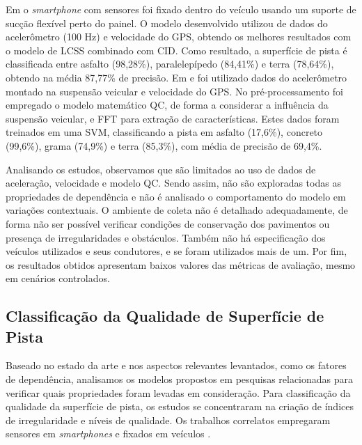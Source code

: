 Em \cite{Souza2018} o \textit{smartphone} com sensores foi fixado dentro do veículo usando um suporte de sucção flexível perto do painel. O modelo desenvolvido utilizou de dados do acelerômetro (100 Hz) e velocidade do GPS, obtendo os melhores resultados com o modelo de LCSS combinado com CID. Como resultado, a superfície de pista é classificada entre asfalto (98,28\%), paralelepípedo (84,41\%) e terra (78,64\%), obtendo na média 87,77\% de precisão. Em  \cite{Wang2018_1} e \cite{Wang2017} foi utilizado dados do acelerômetro montado na suspensão veicular e velocidade do GPS. No pré-processamento foi empregado o modelo matemático QC, de forma a considerar a influência da suspensão veicular, e FFT para extração de características. Estes dados foram treinados em uma SVM, classificando a pista em asfalto (17,6\%), concreto (99,6\%), grama (74,9\%) e terra (85,3\%), com média de precisão de 69,4\%. 

Analisando os estudos, observamos que são limitados ao uso de dados de aceleração, velocidade e modelo QC. Sendo assim, não são exploradas todas as propriedades de dependência e não é analisado o comportamento do modelo em variações contextuais. O ambiente de coleta não é detalhado adequadamente, de forma não ser possível verificar condições de conservação dos pavimentos ou presença de irregularidades e obstáculos. Também não há especificação dos veículos utilizados e seus condutores, e se foram utilizados mais de um. Por fim, os resultados obtidos apresentam baixos valores das métricas de avaliação, mesmo em cenários controlados.

\subsection{Classificação da Qualidade de Superfície de Pista}

Baseado no estado da arte e nos aspectos relevantes levantados, como os fatores de dependência, analisamos os modelos propostos em pesquisas relacionadas para verificar quais propriedades foram levadas em consideração. Para classificação da qualidade da superfície de pista, os estudos se concentraram na criação de índices de irregularidade e níveis de qualidade. Os trabalhos correlatos empregaram sensores em \textit{smartphones} \cite{Douangphachanh2014_1,Lima2016,Brunauer2016,Zhao2016,Allouch2017,Souza2018_1,Li2018,Nunes2019,Tiwari2020,Badurowicz2020,AbdelRaheem2020} e fixados em veículos \cite{Chen2013, Chen2016,Pitonak2016,Prapulla2017,Pont2017,Lei2018,Hassan2019,AbdelRaheem2020,Monica2021}.

